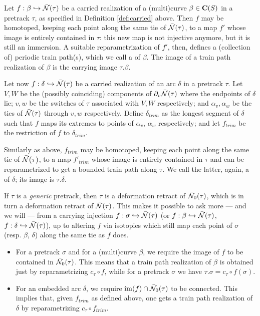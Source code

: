 \begin{defin}\label{def:trainpathrealization}
Let $f:\beta\hookrightarrow\bar{{\mathcal N}}(\tau)$ be a carried realization of a (multi)curve $\beta\in \mathbf C(S)$ in a pretrack $\tau$, as specified in Definition \ref{def:carried} above. Then $f$ may be homotoped, keeping each point along the same tie of $\bar{{\mathcal N}}(\tau)$, to a map $f'$ whose image is entirely contained in $\tau$: this new map is not injective anymore, but it is still an immersion. A suitable reparametrization of $f'$, then, defines a (collection of) periodic train path(s), which we call a  of $\beta$. The image of a train path realization of $\beta$ is the carrying image $\tau.\beta$.

Let now $f:\delta\hookrightarrow\bar{{\mathcal N}}(\tau)$ be a carried realization of an arc $\delta$ in a pretrack $\tau$. Let $V,W$ be the (possibly coinciding) components of $\partial_v\bar{{\mathcal N}}(\tau)$ where the endpoints of $\delta$ lie; $v,w$ be the switches of $\tau$ associated with $V,W$ respectively; and $\alpha_v,\alpha_w$ be the ties of $\bar{{\mathcal N}}(\tau)$ through $v,w$ respectively. Define $\delta_{trim}$ as the longest segment of $\delta$ such that $f$ maps its extremes to points of $\alpha_v$, $\alpha_w$ respectively; and let $f_{trim}$ be the restriction of $f$ to $\delta_{trim}$.

Similarly as above, $f_{trim}$ may be homotoped, keeping each point along the same tie of $\bar{{\mathcal N}}(\tau)$, to a map $f'_{trim}$ whose image is entirely contained in $\tau$ and can be reparametrized to get a bounded train path along $\tau$. We call the latter, again, a  of $\delta$; its image is $\tau.\delta$.
\end{defin}

\begin{rmk}
If $\tau$ is a \emph{generic} pretrack, then $\tau$ is a deformation retract of $\bar{{\mathcal N}}_0(\tau)$, which is in turn a deformation retract of $\bar{{\mathcal N}}(\tau)$. This makes it possible to ask more --- and we will --- from a carrying injection $f:\sigma\hookrightarrow \bar{{\mathcal N}}(\tau)$ (or $f:\beta\hookrightarrow \bar{{\mathcal N}}(\tau)$, $f:\delta\hookrightarrow \bar{{\mathcal N}}(\tau)$), up to altering $f$ via isotopies which still map each point of $\sigma$ (resp. $\beta$, $\delta$) along the same tie as $f$ does.
\begin{itemize}
\item For a pretrack $\sigma$ and for a (multi)curve $\beta$, we require the image of $f$ to be contained in $\bar{{\mathcal N}}_0(\tau)$. This means that a train path realization of $\beta$ is obtained just by reparametrizing $c_\tau\circ f$, while for a pretrack $\sigma$ we have $\tau.\sigma=c_\tau\circ f(\sigma)$.
\item For an embedded arc $\delta$, we require $\mathrm{im}(f)\cap \bar{{\mathcal N}}_0(\tau)$ to be connected. This implies that, given $f_{trim}$ as defined above, one gets a train path realization of $\delta$ by reparametrizing $c_\tau\circ f_{trim}$.
\end{itemize}
\end{rmk}


